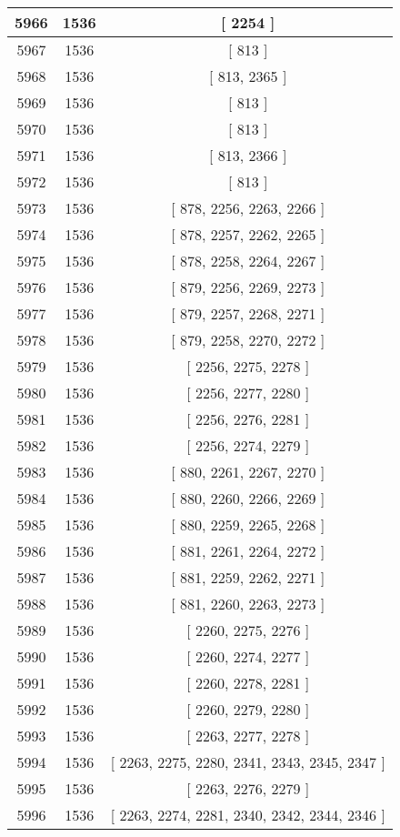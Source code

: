 \begin{center}
\begin{longtable}[H]{|| c c c ||}
\hline
5966 & 1536 & [ 2254 ] \\ 
\hline
5967 & 1536 & [ 813 ] \\ 
\hline
5968 & 1536 & [ 813, 2365 ] \\ 
\hline
5969 & 1536 & [ 813 ] \\ 
\hline
5970 & 1536 & [ 813 ] \\ 
\hline
5971 & 1536 & [ 813, 2366 ] \\ 
\hline
5972 & 1536 & [ 813 ] \\ 
\hline
5973 & 1536 & [ 878, 2256, 2263, 2266 ] \\ 
\hline
5974 & 1536 & [ 878, 2257, 2262, 2265 ] \\ 
\hline
5975 & 1536 & [ 878, 2258, 2264, 2267 ] \\ 
\hline
5976 & 1536 & [ 879, 2256, 2269, 2273 ] \\ 
\hline
5977 & 1536 & [ 879, 2257, 2268, 2271 ] \\ 
\hline
5978 & 1536 & [ 879, 2258, 2270, 2272 ] \\ 
\hline
5979 & 1536 & [ 2256, 2275, 2278 ] \\ 
\hline
5980 & 1536 & [ 2256, 2277, 2280 ] \\ 
\hline
5981 & 1536 & [ 2256, 2276, 2281 ] \\ 
\hline
5982 & 1536 & [ 2256, 2274, 2279 ] \\ 
\hline
5983 & 1536 & [ 880, 2261, 2267, 2270 ] \\ 
\hline
5984 & 1536 & [ 880, 2260, 2266, 2269 ] \\ 
\hline
5985 & 1536 & [ 880, 2259, 2265, 2268 ] \\ 
\hline
5986 & 1536 & [ 881, 2261, 2264, 2272 ] \\ 
\hline
5987 & 1536 & [ 881, 2259, 2262, 2271 ] \\ 
\hline
5988 & 1536 & [ 881, 2260, 2263, 2273 ] \\ 
\hline
5989 & 1536 & [ 2260, 2275, 2276 ] \\ 
\hline
5990 & 1536 & [ 2260, 2274, 2277 ] \\ 
\hline
5991 & 1536 & [ 2260, 2278, 2281 ] \\ 
\hline
5992 & 1536 & [ 2260, 2279, 2280 ] \\ 
\hline
5993 & 1536 & [ 2263, 2277, 2278 ] \\ 
\hline
5994 & 1536 & [ 2263, 2275, 2280, 2341, 2343, 2345, 2347 ] \\ 
\hline
5995 & 1536 & [ 2263, 2276, 2279 ] \\ 
\hline
5996 & 1536 & [ 2263, 2274, 2281, 2340, 2342, 2344, 2346 ] \\ 

\end{longtable}
\end{center}
